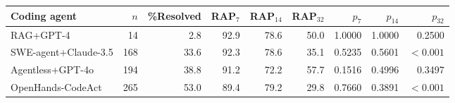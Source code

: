 \begin{tabular}{lrrrrrrrr}
\toprule
Coding agent & $n$ & \%Resolved & RAP$_7$ & RAP$_{14}$ & RAP$_{32}$ & $p_7$ & $p_{14}$ & $p_{32}$ \\
\midrule
RAG+GPT-4 & 14 & 2.8 & 92.9 & 78.6 & 50.0 & 1.0000 & 1.0000 & 0.2500 \\
SWE-agent+Claude-3.5 & 168 & 33.6 & 92.3 & 78.6 & 35.1 & 0.5235 & 0.5601 & $<0.001$ \\
Agentless+GPT-4o & 194 & 38.8 & 91.2 & 72.2 & 57.7 & 0.1516 & 0.4996 & 0.3497 \\
OpenHands-CodeAct & 265 & 53.0 & 89.4 & 79.2 & 29.8 & 0.7660 & 0.3891 & $<0.001$ \\
\bottomrule
\end{tabular}

